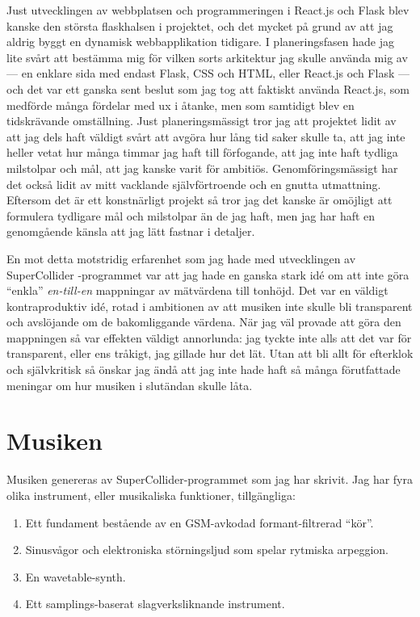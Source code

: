 \documentclass[11pt, a4paper]{article} %
\begin{document}
Just utvecklingen av webbplatsen och programmeringen i React.js och Flask blev kanske den största flaskhalsen i projektet, och det mycket på grund av att jag aldrig byggt en dynamisk webbapplikation tidigare. I planeringsfasen hade jag lite svårt att bestämma mig för vilken sorts arkitektur jag skulle använda mig av --- en enklare sida med endast Flask, CSS och HTML, eller React.js och Flask --- och det var ett ganska sent beslut som jag tog att faktiskt använda React.js, som medförde många fördelar med \gls{ux} i åtanke, men som samtidigt blev en tidskrävande omställning. Just planeringsmässigt tror jag att projektet lidit av att jag dels haft väldigt svårt att avgöra hur lång tid saker skulle ta, att jag inte heller vetat hur många timmar jag haft till förfogande, att jag inte haft tydliga milstolpar och mål, att jag kanske varit för ambitiös. Genomföringsmässigt har det också lidit av mitt vacklande självförtroende och en gnutta utmattning. Eftersom det är ett konstnärligt projekt så tror jag det kanske är omöjligt att formulera tydligare mål och milstolpar än de jag haft, men jag har haft en genomgående känsla att jag lätt fastnar i detaljer. 

En mot detta motstridig erfarenhet som jag hade med utvecklingen av SuperCollider -programmet var att jag hade en ganska stark idé om att inte göra ``enkla'' \emph{en-till-en} mappningar av mätvärdena till tonhöjd. Det var en väldigt kontraproduktiv idé, rotad i ambitionen av att musiken inte skulle bli transparent och avslöjande om de bakomliggande värdena. När jag väl provade att göra den mappningen så var effekten väldigt annorlunda: jag tyckte inte alls att det var för transparent, eller ens tråkigt, jag gillade hur det lät. Utan att bli allt för efterklok och självkritisk så önskar jag ändå att jag inte hade haft så många förutfattade meningar om hur musiken i slutändan skulle låta.

\section*{Musiken}

Musiken genereras av SuperCollider-programmet som jag har skrivit. Jag har fyra olika instrument, eller musikaliska funktioner, tillgängliga:

  \begin{enumerate}[noitemsep]
	\item Ett fundament bestående av en GSM-avkodad formant-filtrerad ``kör''.
	\item Sinusvågor och elektroniska störningsljud som spelar rytmiska arpeggion.
	\item En wavetable-synth.
	\item Ett samplings-baserat slagverksliknande instrument.
  \end{enumerate}
\end{document}
